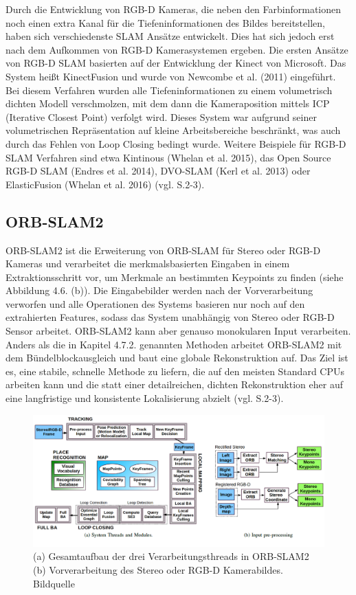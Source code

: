Durch die Entwicklung von RGB-D Kameras, die neben den Farbinformationen noch einen extra Kanal für die Tiefeninformationen des Bildes bereitstellen, haben sich verschiedenste SLAM Ansätze entwickelt. Dies hat sich jedoch erst nach dem Aufkommen von RGB-D Kamerasystemen ergeben. Die ersten Ansätze von RGB-D SLAM basierten auf der Entwicklung der Kinect von Microsoft. Das System heißt KinectFusion und wurde von Newcombe et al. (2011) eingeführt. Bei diesem Verfahren wurden alle Tiefeninformationen zu einem volumetrisch dichten Modell verschmolzen, mit dem dann die Kameraposition mittels ICP (Iterative Closest Point) verfolgt wird. Dieses System war aufgrund seiner volumetrischen Repräsentation auf kleine Arbeitsbereiche beschränkt, was auch durch das Fehlen von Loop Closing bedingt wurde. Weitere Beispiele für RGB-D SLAM Verfahren sind etwa \glqq Kintinous\grqq{} (Whelan et al. 2015), das Open Source RGB-D SLAM (Endres et al. 2014), \glqq DVO-SLAM\grqq{} (Kerl et al. 2013) oder \glqq ElasticFusion\grqq{} (Whelan et al. 2016) (vgl. \cite{orbslam2} S.2-3).

\subsection{ORB-SLAM2}

ORB-SLAM2 ist die Erweiterung von ORB-SLAM für Stereo oder RGB-D Kameras und verarbeitet die merkmalsbasierten Eingaben in einem Extraktionsschritt vor, um Merkmale an bestimmten Keypoints zu finden (siehe Abbildung 4.6. (b)). Die Eingabebilder werden nach der Vorverarbeitung verworfen und alle Operationen des Systems basieren nur noch auf den extrahierten Features, sodass das System unabhängig von Stereo oder RGB-D Sensor arbeitet. ORB-SLAM2 kann aber genauso monokularen Input verarbeiten. Anders als die in Kapitel 4.7.2. genannten Methoden arbeitet ORB-SLAM2 mit dem Bündelblockausgleich und baut eine globale Rekonstruktion auf. Das Ziel ist es, eine stabile, schnelle Methode zu liefern, die auf den meisten Standard CPUs arbeiten kann und die statt einer detailreichen, dichten Rekonstruktion eher auf eine langfristige und konsistente Lokalisierung abzielt (vgl. \cite{orbslam2} S.2-3).

\begin{figure}[H]
	\centering
	\includegraphics[scale=0.56]{orbslam2.png}
	\caption{(a) Gesamtaufbau der drei Verarbeitungsthreads in ORB-SLAM2 (b) Vorverarbeitung des Stereo oder RGB-D Kamerabildes. Bildquelle \cite{orbslam2}}
\end{figure}  




















